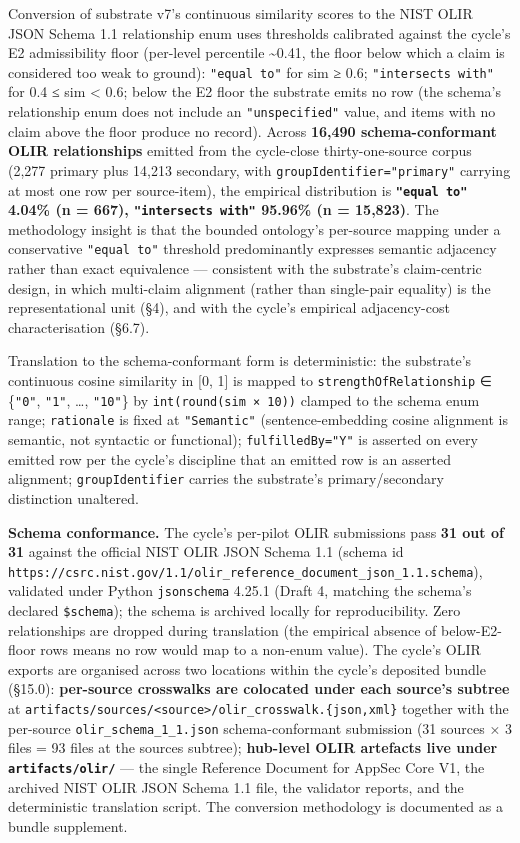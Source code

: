 \documentclass[
]{article}
\begin{document}
Conversion of substrate v7's continuous similarity scores to the NIST
OLIR JSON Schema 1.1 relationship enum uses thresholds calibrated
against the cycle's E2 admissibility floor (per-level percentile
\textasciitilde0.41, the floor below which a claim is considered too
weak to ground): \texttt{"equal\ to"} for sim ≥ 0.6;
\texttt{"intersects\ with"} for 0.4 ≤ sim \textless{} 0.6; below the E2
floor the substrate emits no row (the schema's relationship enum does
not include an \texttt{"unspecified"} value, and items with no claim
above the floor produce no record). Across \textbf{16,490
schema-conformant OLIR relationships} emitted from the cycle-close
thirty-one-source corpus (2,277 primary plus 14,213 secondary, with
\texttt{groupIdentifier="primary"} carrying at most one row per
source-item), the empirical distribution is \textbf{\texttt{"equal\ to"}
4.04\% (n = 667), \texttt{"intersects\ with"} 95.96\% (n = 15,823)}. The
methodology insight is that the bounded ontology's per-source mapping
under a conservative \texttt{"equal\ to"} threshold predominantly
expresses semantic adjacency rather than exact equivalence ---
consistent with the substrate's claim-centric design, in which
multi-claim alignment (rather than single-pair equality) is the
representational unit (§4), and with the cycle's empirical
adjacency-cost characterisation (§6.7).

Translation to the schema-conformant form is deterministic: the
substrate's continuous cosine similarity in {[}0, 1{]} is mapped to
\texttt{strengthOfRelationship} ∈ \{\texttt{"0"}, \texttt{"1"}, \ldots,
\texttt{"10"}\} by \texttt{int(round(sim\ ×\ 10))} clamped to the schema
enum range; \texttt{rationale} is fixed at \texttt{"Semantic"}
(sentence-embedding cosine alignment is semantic, not syntactic or
functional); \texttt{fulfilledBy="Y"} is asserted on every emitted row
per the cycle's discipline that an emitted row is an asserted alignment;
\texttt{groupIdentifier} carries the substrate's primary/secondary
distinction unaltered.

\textbf{Schema conformance.} The cycle's per-pilot OLIR submissions pass
\textbf{31 out of 31} against the official NIST OLIR JSON Schema 1.1
(schema id
\texttt{https://csrc.nist.gov/1.1/olir\_reference\_document\_json\_1.1.schema}),
validated under Python \texttt{jsonschema} 4.25.1 (Draft 4, matching the
schema's declared \texttt{\$schema}); the schema is archived locally for
reproducibility. Zero relationships are dropped during translation (the
empirical absence of below-E2-floor rows means no row would map to a
non-enum value). The cycle's OLIR exports are organised across two
locations within the cycle's deposited bundle (§15.0):
\textbf{per-source crosswalks are colocated under each source's subtree}
at
\texttt{artifacts/sources/\textless{}source\textgreater{}/olir\_crosswalk.\{json,xml\}}
together with the per-source \texttt{olir\_schema\_1\_1.json}
schema-conformant submission (31 sources × 3 files = 93 files at the
sources subtree); \textbf{hub-level OLIR artefacts live under
\texttt{artifacts/olir/}} --- the single Reference Document for AppSec
Core V1, the archived NIST OLIR JSON Schema 1.1 file, the validator
reports, and the deterministic translation script. The conversion
methodology is documented as a bundle supplement.
\end{document}

